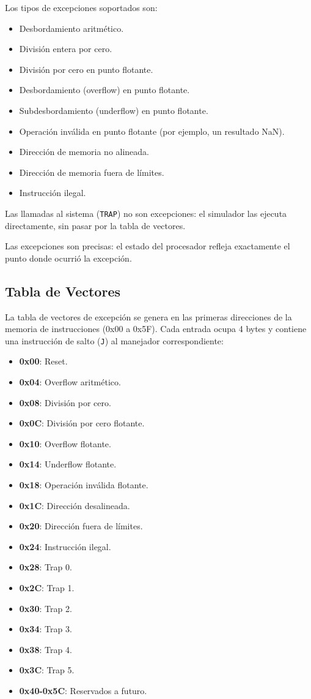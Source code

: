 \documentclass[../main.tex]{subfiles}
\begin{document}
Los tipos de excepciones soportados son:
\begin{itemize}
	\item Desbordamiento aritmético.
	\item División entera por cero.
	\item División por cero en punto flotante.
	\item Desbordamiento (overflow) en punto flotante.
	\item Subdesbordamiento (underflow) en punto flotante.
	\item Operación inválida en punto flotante (por ejemplo, un resultado NaN).
	\item Dirección de memoria no alineada.
	\item Dirección de memoria fuera de límites.
	\item Instrucción ilegal.
\end{itemize}

Las llamadas al sistema (\texttt{TRAP}) no son excepciones: el simulador las ejecuta directamente, sin pasar por la tabla de vectores.

Las excepciones son precisas: el estado del procesador refleja exactamente el punto donde ocurrió la excepción.

\subsection{Tabla de Vectores}

La tabla de vectores de excepción se genera en las primeras direcciones de la memoria de instrucciones (0x00 a 0x5F). Cada entrada ocupa 4 bytes y contiene una instrucción de salto (\texttt{J}) al manejador correspondiente:

\begin{itemize}
	\item \textbf{0x00}: Reset.
	\item \textbf{0x04}: Overflow aritmético.
	\item \textbf{0x08}: División por cero.
	\item \textbf{0x0C}: División por cero flotante.
	\item \textbf{0x10}: Overflow flotante.
	\item \textbf{0x14}: Underflow flotante.
	\item \textbf{0x18}: Operación inválida flotante.
	\item \textbf{0x1C}: Dirección desalineada.
	\item \textbf{0x20}: Dirección fuera de límites.
	\item \textbf{0x24}: Instrucción ilegal.
	\item \textbf{0x28}: Trap 0.
	\item \textbf{0x2C}: Trap 1.
	\item \textbf{0x30}: Trap 2.
	\item \textbf{0x34}: Trap 3.
	\item \textbf{0x38}: Trap 4.
	\item \textbf{0x3C}: Trap 5.
	\item \textbf{0x40-0x5C}: Reservados a futuro.
\end{itemize}
\end{document}
